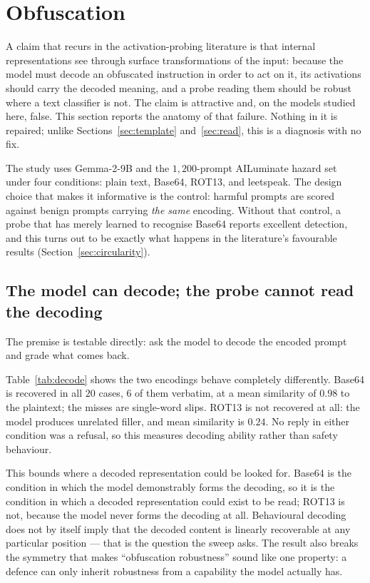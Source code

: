 \section{Obfuscation}
\label{sec:obfuscation}

A claim that recurs in the activation-probing literature is that internal representations see through surface
transformations of the input: because the model must decode an obfuscated instruction in order to act on it, its
activations should carry the decoded meaning, and a probe reading them should be robust where a text classifier is
not. The claim is attractive and, on the models studied here, false. This section reports the anatomy of that failure.
Nothing in it is repaired; unlike Sections~\ref{sec:template} and~\ref{sec:read}, this is a diagnosis with no fix.

The study uses Gemma-2-9B and the $1{,}200$-prompt AILuminate hazard set under four conditions: plain text, Base64,
ROT13, and leetspeak. The design choice that makes it informative is the control: harmful prompts are scored against
benign prompts carrying \emph{the same} encoding. Without that control, a probe that has merely learned to recognise
Base64 reports excellent detection, and this turns out to be exactly what happens in the literature's favourable
results (Section~\ref{sec:circularity}).

\subsection{The model can decode; the probe cannot read the decoding}
\label{sec:decode}

The premise is testable directly: ask the model to decode the encoded prompt and grade what comes back.



Table~\ref{tab:decode} shows the two encodings behave completely differently. Base64 is recovered in all $20$ cases,
$6$ of them verbatim, at a mean similarity of $0.98$ to the plaintext; the misses are single-word slips. ROT13 is not
recovered at all: the model produces unrelated filler, and mean similarity is $0.24$. No reply in either condition was
a refusal, so this measures decoding ability rather than safety behaviour.

This bounds where a decoded representation could be looked for. Base64 is the condition in which the model
demonstrably forms the decoding, so it is the condition in which a decoded representation could exist to be read;
ROT13 is not, because the model never forms the decoding at all. Behavioural decoding does not by itself imply that
the decoded content is linearly recoverable at any particular position --- that is the question the sweep asks. The result also breaks the symmetry that makes ``obfuscation robustness'' sound like one property: a defence
can only inherit robustness from a capability the model actually has.

